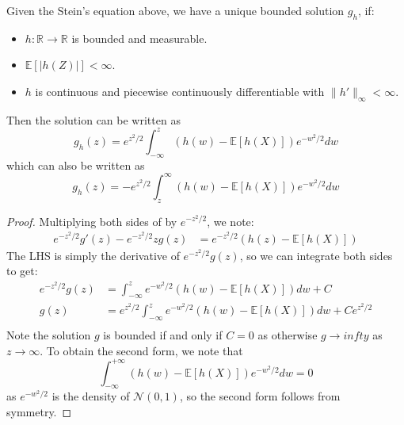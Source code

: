 \documentclass{article}
\begin{document}
\begin{lemma}\label{lem:stein_equation_normal}
    Given the Stein's equation above, we have a unique bounded solution $g_h$, if:
    \begin{itemize}
        \item $h:\mathbb{R} \to \mathbb{R}$ is bounded and measurable.
        \item $\mathbb{E}[|h(Z)|] < \infty$.
        \item $h$ is continuous and piecewise continuously differentiable with $\|h'\|_\infty < \infty$.
    \end{itemize}

        Then the solution can be written as
        \begin{equation*}
            g_h(z) = e^{z^2/2} \int_{-\infty}^z (h(w) - \mathbb{E}[h(X)]) e^{-w^2/2} dw
        \end{equation*}
        which can also be written as
        \begin{equation*}
            g_h(z) = -e^{z^2/2} \int_{z}^\infty (h(w) - \mathbb{E}[h(X)]) e^{-w^2/2} dw
        \end{equation*}
    \end{lemma}

    \begin{proof}
        Multiplying both sides of  by $e^{-z^2/2}$, we note:
        \begin{align*}
            e^{-z^2/2} g'(z) - e^{-z^2/2}zg(z) &= e^{-z^2/2} (h(z) - \mathbb{E}[h(X)]) 
        \end{align*}
        The LHS is simply the derivative of $e^{-z^2/2}g(z)$, so we can integrate both sides to get:
        \begin{align*}
            e^{-z^2/2}g(z) &= \int_{-\infty}^z e^{-w^2/2} (h(w) - \mathbb{E}[h(X)]) dw +C\\
            g(z) &= e^{z^2/2} \int_{-\infty}^z e^{-w^2/2} (h(w) - \mathbb{E}[h(X)]) dw + Ce^{z^2/2}\\
        \end{align*}
        Note the solution $g$ is bounded if and only if $C=0$ as otherwise $g\to infty$ as $z\to \infty$.  
        To obtain the second form, we note that 
        \begin{equation*}
            \int_{-\infty}^{+\infty} (h(w) - \mathbb{E}[h(X)]) e^{-w^2/2} dw = 0
        \end{equation*}
        as $e^{-w^2/2}$ is the density of $\mathcal{N}(0,1)$, so the second form follows from symmetry.
    \end{proof}
\end{document}
